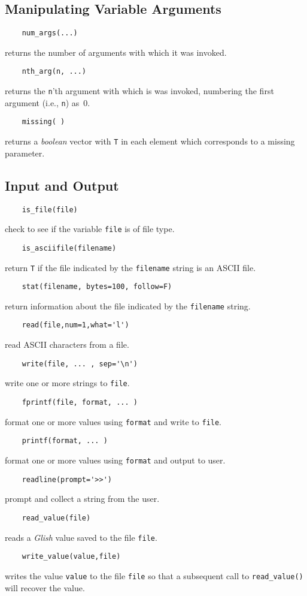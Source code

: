 \subsection{Manipulating Variable Arguments}
\begin{verbatim}
    num_args(...)
\end{verbatim}
returns the number of arguments with which it was invoked.
\begin{verbatim}
    nth_arg(n, ...)
\end{verbatim}
returns the {\tt n}'th argument with which is was invoked, numbering
the first argument (i.e., {\tt n}) as~0.
\begin{verbatim}
    missing( )
\end{verbatim}
returns a {\em boolean} vector with {\tt T} in each element which
corresponds to a missing parameter.

\subsection{Input and Output}
\begin{verbatim}
    is_file(file)
\end{verbatim}
check to see if the variable {\tt file} is of file type.
\begin{verbatim}
    is_asciifile(filename)
\end{verbatim}
return {\tt T} if the file indicated by the {\tt filename} string is an ASCII
file.
\begin{verbatim}
    stat(filename, bytes=100, follow=F)
\end{verbatim}
return information about the file indicated by the {\tt filename} string.
\begin{verbatim}
    read(file,num=1,what='l')
\end{verbatim}
read ASCII characters from a file.
\begin{verbatim}
    write(file, ... , sep='\n')
\end{verbatim}
write one or more strings to {\tt file}.
\begin{verbatim}
    fprintf(file, format, ... )
\end{verbatim}
format one or more values using {\tt format} and write to {\tt file}.
\begin{verbatim}
    printf(format, ... )
\end{verbatim}
format one or more values using {\tt format} and output to user.
\begin{verbatim}
    readline(prompt='>>')
\end{verbatim}
prompt and collect a string from the user.
\begin{verbatim}
    read_value(file)
\end{verbatim}
reads a {\em Glish} value saved to the file {\tt file}.
\begin{verbatim}
    write_value(value,file)
\end{verbatim}
writes the value {\tt value} to the file {\tt file} so that a subsequent
call to {\tt read\_value()} will recover the value.

